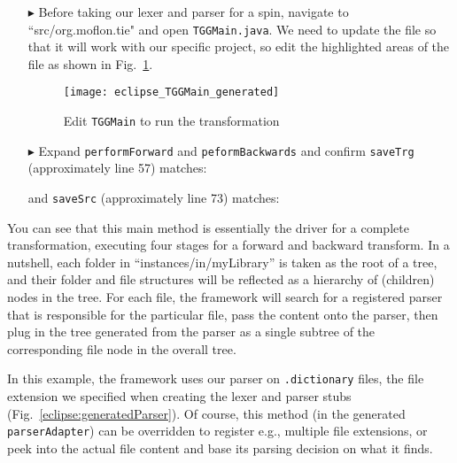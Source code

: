 \begin{itemize}

\item[$\blacktriangleright$] Before taking our lexer and parser for a spin, navigate to ``src\-/org\-.mof\-lon\-.tie" and open \texttt{TGGMain.java}. We need to
update the file so that it will work with our specific project, so edit the highlighted areas of the file as shown in Fig.~\ref{eclipse:defaultTGGMain}. 

\vspace{0.5cm}

\begin{figure}[!htbp]
\begin{center}
 \texttt{[image: eclipse\_TGGMain\_generated]}
  \caption{Edit \texttt{TGGMain} to run the transformation}
  \label{eclipse:defaultTGGMain}
\end{center}
\end{figure}


\item[$\blacktriangleright$] Expand \texttt{performForward} and \texttt{peformBackwards} and confirm \texttt{saveTrg} (approximately line 57) matches:

and \texttt{saveSrc} (approximately line 73) matches:

\end{itemize}

\newpage

You can see that this main method is essentially the driver for a complete transformation, executing four stages for a forward and backward transform. In a
nutshell, each folder in ``instances/in/myLibrary'' is taken as the root of a tree, and their folder and file structures will be reflected as a hierarchy of
(children) nodes in the tree. For each file, the framework will search for a registered parser that is responsible for the particular file, pass the content
onto the parser, then plug in the tree generated from the parser as a single subtree of the corresponding file node in the overall tree.

In this example, the framework uses our parser on \texttt{.dictionary} files, the file extension we specified when creating the lexer and parser stubs
(Fig.~\ref{eclipse:generatedParser}). Of course, this method (in the generated \texttt{parserAdapter}) can be overridden to register e.g., multiple
file extensions, or peek into the actual file content and base its parsing decision on what it finds.


